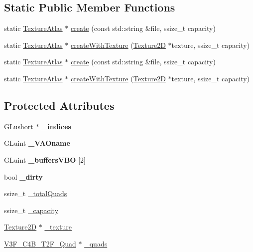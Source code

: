 \subsection*{Static Public Member Functions}
\begin{DoxyCompactItemize}
\item 
static \hyperlink{classTextureAtlas}{Texture\+Atlas} $\ast$ \hyperlink{classTextureAtlas_a6e44c9ac5bfa5c9216facea7d11cbb64}{create} (const std\+::string \&file, ssize\+\_\+t capacity)
\item 
static \hyperlink{classTextureAtlas}{Texture\+Atlas} $\ast$ \hyperlink{classTextureAtlas_a2d41f36bf9d0aee784b604a0f2c34c1f}{create\+With\+Texture} (\hyperlink{classTexture2D}{Texture2D} $\ast$texture, ssize\+\_\+t capacity)
\item 
static \hyperlink{classTextureAtlas}{Texture\+Atlas} $\ast$ \hyperlink{classTextureAtlas_a5be100c58863b5e6d3c364661feaa5dd}{create} (const std\+::string \&file, ssize\+\_\+t capacity)
\item 
static \hyperlink{classTextureAtlas}{Texture\+Atlas} $\ast$ \hyperlink{classTextureAtlas_aa71e400bb67b6d77871ae76a32750bdf}{create\+With\+Texture} (\hyperlink{classTexture2D}{Texture2D} $\ast$texture, ssize\+\_\+t capacity)
\end{DoxyCompactItemize}
\subsection*{Protected Attributes}
\begin{DoxyCompactItemize}
\item 
\mbox{\label{classTextureAtlas_a05137b254a67579fbcac5eacb8ddfe41}} 
G\+Lushort $\ast$ {\bfseries \+\_\+indices}
\item 
\mbox{\label{classTextureAtlas_a328745753a486782c44981b1459d2816}} 
G\+Luint {\bfseries \+\_\+\+V\+A\+Oname}
\item 
\mbox{\label{classTextureAtlas_a7fc7e17876e8b141f1ca06eac3624e9e}} 
G\+Luint {\bfseries \+\_\+buffers\+V\+BO} \mbox{[}2\mbox{]}
\item 
\mbox{\label{classTextureAtlas_a96b7de7276005b23cde2523f5ce05b89}} 
bool {\bfseries \+\_\+dirty}
\item 
ssize\+\_\+t \hyperlink{classTextureAtlas_a57a013f57401888005ebbd4961f57d5b}{\+\_\+total\+Quads}
\item 
ssize\+\_\+t \hyperlink{classTextureAtlas_a27aaf85e903dedaa496bb88e58b6d9b7}{\+\_\+capacity}
\item 
\hyperlink{classTexture2D}{Texture2D} $\ast$ \hyperlink{classTextureAtlas_adadaa6b0c4db68168819b743b30074a6}{\+\_\+texture}
\item 
\hyperlink{structV3F__C4B__T2F__Quad}{V3\+F\+\_\+\+C4\+B\+\_\+\+T2\+F\+\_\+\+Quad} $\ast$ \hyperlink{classTextureAtlas_a923f5462dd2253d7391f39edbd92f9cf}{\+\_\+quads}
\end{DoxyCompactItemize}
